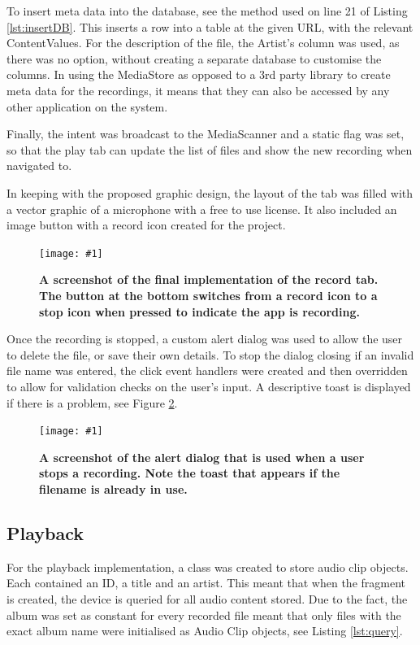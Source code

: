 \documentclass[conference]{acmsiggraph}
\newcommand{\figuremacroF}[3]{
	\begin{figure}[H] %
		\centering
		\texttt{[image: \#1]}
		\caption[#2]{\textbf{#2}}
		\label{fig:#1}
	\end{figure}
}
\begin{document}
To insert meta data into the database, see the method used on line 21 of Listing \ref{lst:insertDB}. This inserts a row into a table at the given URL, with the relevant ContentValues. For the description of the file, the Artist's column was used, as there was no option, without creating a separate database to customise the columns. In using the MediaStore as opposed to a 3rd party library to create meta data for the recordings, it means that they can also be accessed by any other application on the system.

Finally, the intent was broadcast to the MediaScanner and a static flag was set, so that the play tab can update the list of files and show the new recording when navigated to.

In keeping with the proposed graphic design, the layout of the tab was filled with a vector graphic of a microphone with a free to use license. \cite{microphone} It also included an image button with a record icon created for the project.

\figuremacroF
{PlayTabSS}
{A screenshot of the final implementation of the record tab. The button at the bottom switches from a record icon to a stop icon when pressed to indicate the app is recording.}
{1.0}

Once the recording is stopped, a custom alert dialog was used to allow the user to delete the file, or save their own details. To stop the dialog closing if an invalid file name was entered, the click event handlers were created and then overridden to allow for validation checks on the user's input. A descriptive toast is displayed if there is a problem, see Figure \ref{fig:dialog}.

\figuremacroF
{dialog}
{A screenshot of the alert dialog that is used when a user stops a recording. Note the toast that appears if the filename is already in use.}
{1.0}

\subsection{Playback}

For the playback implementation, a class was created to store audio clip objects. Each contained an ID, a title and an artist. This meant that when the fragment is created, the device is queried for all audio content stored. Due to the fact, the album was set as constant for every recorded file meant that only files with the exact album name were initialised as Audio Clip objects, see Listing \ref{lst:query}.
\end{document}
